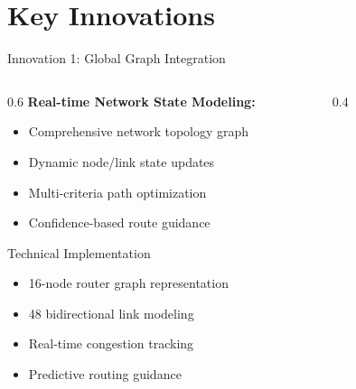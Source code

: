 \documentclass[10pt]{beamer}
\begin{document}
\section{Key Innovations}

\begin{frame}{Innovation 1: Global Graph Integration}
    \begin{columns}
        \begin{column}{0.6\textwidth}
            \textbf{Real-time Network State Modeling:}
            \begin{itemize}
                \item Comprehensive network topology graph
                \item Dynamic node/link state updates
                \item Multi-criteria path optimization
                \item Confidence-based route guidance
            \end{itemize}
            
            \begin{block}{Technical Implementation}
                \begin{itemize}
                    \item 16-node router graph representation
                    \item 48 bidirectional link modeling
                    \item Real-time congestion tracking
                    \item Predictive routing guidance
                \end{itemize}
            \end{block}
        \end{column}
        \begin{column}{0.4\textwidth}
            \begin{figure}
                \centering
\end{figure}
\end{column}
\end{columns}
\end{frame}
\end{document}
